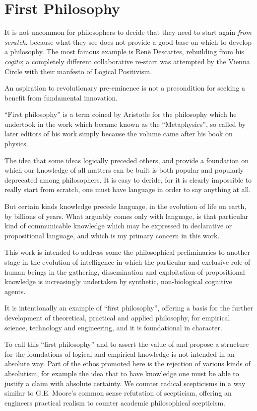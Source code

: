 \documentclass[10pt,titlepage]{book}
\begin{document}
\section{First Philosophy}

It is not uncommon for philosophers to decide that they need to start again \emph{from scratch}, because what they see does not provide a good base on which to develop a philosophy.
The most famous example is Ren\"{e} Descartes, rebuilding from his \emph{cogito}; a completely different collaborative re-start was attempted by the Vienna Circle with their manfesto of Logical Positivism.

An aspiration to revolutionary pre-eminence is not a precondition for seeking a benefit from fundamental innovation.

``First philosophy'' is a term coined by Aristotle for the philosophy which he undertook in the work which became known as the ``Metaphysics'', so called by later editors of his work simply because the volume came after his book on physics.

The idea that some ideas logically preceded others, and provide a foundation on which our knowledge of all matters can be built is both popular and popularly deprecated among philosophers.
It is easy to deride, for it is clearly impossible to really start from scratch, one must have language in order to say anything at all.

But certain kinds knowledge precede language, in the evolution of life on earth, by billions of years.
What arguably comes only with language, is that particular kind of communicable knowledge which may be expressed in declarative or propositional language, and which is my primary concern in this work.

This work is intended to address some the philosophical preliminaries to another stage in the evolution of intelligence in which the particular and exclusive role of human beings in the gathering, dissemination and exploitation of propositional knowledge is increasingly undertaken by synthetic, non-biological cognitive agents.

It is intentionally an example of ``first philosophy'', offering a basis for the further development of theoretical, practical and applied philosophy, for empirical science, technology and engineering, and it is foundational in character.

To call this ``first philosophy'' and to assert the value of and propose a structure for the foundations of logical and empirical knowledge is not intended in an absolute way.
Part of the ethos promoted here is the rejection of various kinds of absolutism, for example the idea that to have knowledge one must be able to justify a claim with absolute certainty.
We counter radical scepticisms in a way similar to G.E. Moore's common sense refutation of scepticism, offering an engineers practical realism to counter academic philosophical scepticism.
\end{document}
